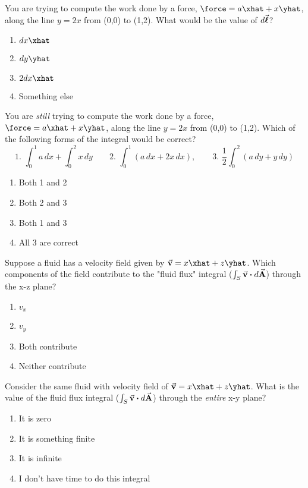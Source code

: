 \documentclass[pdf,aspectratio=169]{beamer}
\begin{document}
\begin{frame}{}
	You are trying to compute the work done by a force, $\force=a\xhat + x\yhat$, along the line $y=2x$ from (0,0) to (1,2). What would be the value of $d\va*{\ell}$?
	\begin{enumerate}
		\item $dx \xhat$
		\item $dy \yhat$
		\item $2dx \xhat$
		\item \alert<2>{Something else}
	\end{enumerate}
\end{frame}

\begin{frame}{}
	You are \emph{still} trying to compute the work done by a force, $\force=a\xhat + x\yhat$, along the line $y=2x$ from (0,0) to (1,2). Which of the following forms of the integral would be correct?
	\[1.\,\,\int_0^1 a\,dx + \int_0^2 x\,dy \qquad 2.\,\,\int_0^1 (a\,dx + 2x\, dx), \qquad 3.\,\, \frac{1}{2}\int_0^2(a\,dy + y\,dy)\]
	\begin{enumerate}
		\item Both 1 and 2
		\item \alert<2>{Both 2 and 3}
		\item Both 1 and 3
		\item All 3 are correct
	\end{enumerate}
\end{frame}

\begin{frame}{}
	Suppose a fluid has a velocity field given by $\va{v} = x\xhat + z\yhat$. Which components of the field contribute to the "fluid flux" integral ($\int_S \va{v}\vdot d\va{A}$) through the x-z plane?
	\begin{enumerate}
		\item $v_x$
		\item \alert<2>{$v_y$}
		\item Both contribute
		\item Neither contribute
	\end{enumerate}
\end{frame}

\begin{frame}{}
	Consider the same fluid with velocity field of $\va{v} = x\xhat + z\yhat$. What is the value of the fluid flux integral ($\int_S \va{v}\vdot d\va{A}$) through the \emph{entire} x-y plane?
	\begin{enumerate}
		\item \alert<2>{It is zero}
		\item It is something finite
		\item It is infinite
		\item I don't have time to do this integral
	\end{enumerate}
\end{frame}
\end{document}
